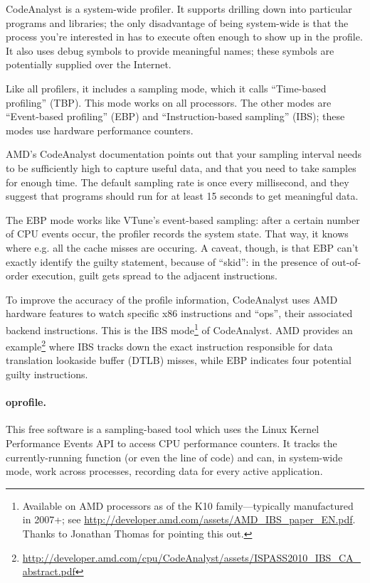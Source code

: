 \documentclass[a4paper]{report}
\begin{document}
CodeAnalyst is a system-wide profiler. It supports drilling down into
particular programs and libraries; the only disadvantage of being
system-wide is that the process you're interested in has to execute
often enough to show up in the profile. It also uses debug symbols to
provide meaningful names; these symbols are potentially supplied over
the Internet.

Like all profilers, it includes a sampling mode, which it calls ``Time-based
profiling'' (TBP). This mode works on all processors. The other modes are 
``Event-based profiling'' (EBP) and ``Instruction-based sampling'' (IBS);
these modes use hardware performance counters.

AMD's CodeAnalyst documentation points out that your sampling interval
needs to be sufficiently high to capture useful data, and that you need to 
take samples for enough time. The default sampling rate is once every
millisecond, and they suggest that programs should run for at least 15 seconds
to get meaningful data.

The EBP mode works like VTune's event-based sampling: after a certain
number of CPU events occur, the profiler records the system state.
That way, it knows where e.g. all the cache misses are occuring.
A caveat, though, is that EBP can't exactly identify the guilty statement,
because of ``skid'': in the presence of out-of-order execution, guilt
gets spread to the adjacent instructions.

To improve the accuracy of the profile information, CodeAnalyst uses
AMD hardware features to watch specific x86 instructions and ``ops'',
their associated backend instructions. This is the IBS mode\footnote{Available
on AMD processors as of the K10 family---typically manufactured in 2007+; see \url{http://developer.amd.com/assets/AMD_IBS_paper_EN.pdf}. Thanks to Jonathan Thomas for pointing this out.} of
CodeAnalyst.  AMD provides an
example\footnote{\url{http://developer.amd.com/cpu/CodeAnalyst/assets/ISPASS2010_IBS_CA_abstract.pdf}}
where IBS tracks down the exact instruction responsible for data
translation lookaside buffer (DTLB) misses, while EBP indicates four
potential guilty instructions.


\paragraph{oprofile.} This free software is a sampling-based tool which uses the Linux Kernel Performance
Events API to access CPU performance counters. It tracks the
currently-running function (or even the line of code) and can, in
system-wide mode, work across processes, recording data for every
active application.
\end{document}
